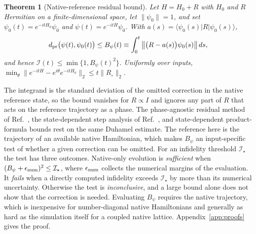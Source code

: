 \documentclass[pra,twocolumn,superscriptaddress,nofootinbib,floatfix]{revtex4-2}
\newtheorem{theorem}{Theorem}
\theoremstyle{remark}
\newcommand{\dpr}{d_{\rm pr}}
\newcommand{\revcolor}{\color{blue}}
\DeclareRobustCommand{\rev}[1]{{\revcolor #1}}
\begin{document}
\begingroup\revcolor
\begin{theorem}[Native-reference residual bound]
\label{thm:native-residual}
Let \(H=H_0+R\) with \(H_0\) and \(R\) Hermitian on a finite-dimensional space, let \(\|\psi_0\|=1\), and set \(\psi_0(t)=e^{-itH_0}\psi_0\) and \(\psi(t)=e^{-itH}\psi_0\). With \(a(s)=\langle\psi_0(s)|R|\psi_0(s)\rangle\),
\begin{align}
\dpr\big(\psi(t),\psi_0(t)\big)\le B_\psi(t)\equiv\int_0^t\big\|\big(R-a(s)\big)\psi_0(s)\big\|\,ds ,
\label{eq:native-residual}
\end{align}
and hence \(\mathcal I(t)\le\min\{1,B_\psi(t)^2\}\). Uniformly over inputs, \(\min_\theta\|e^{-itH}-e^{i\theta}e^{-itH_0}\|_2\le t\|R_\circ\|_2\).
\end{theorem}
\endgroup

\rev{The integrand is the standard deviation of the omitted correction in the native reference state, so the bound vanishes for \(R\propto I\) and ignores any part of \(R\) that acts on the reference trajectory as a phase.} \rev{The phase-agnostic residual method of Ref.~\cite{Zoufal2023}, the state-dependent step analysis of Ref.~\cite{Hatomura2022}, and state-dependent product-formula bounds \cite{AnFangLin2021,Burgarth2024Strong} rest on the same Duhamel estimate.} \rev{The reference here is the trajectory of an available native Hamiltonian, which makes \(B_\psi\) an input-specific test of whether a given correction can be omitted.} \rev{For an infidelity threshold \(\mathcal I_\star\) the test has three outcomes.} \rev{Native-only evolution is \emph{sufficient} when \((B_\psi+\epsilon_{\rm num})^2\le\mathcal I_\star\), where \(\epsilon_{\rm num}\) collects the numerical margins of the evaluation.} \rev{It \emph{fails} when a directly computed infidelity exceeds \(\mathcal I_\star\) by more than its numerical uncertainty.} \rev{Otherwise the test is \emph{inconclusive}, and a large bound alone does not show that the correction is needed.} \rev{Evaluating \(B_\psi\) requires the native trajectory, which is inexpensive for number-diagonal native Hamiltonians and generally as hard as the simulation itself for a coupled native lattice.} \rev{Appendix~\ref{app:proofs} gives the proof.}
\end{document}
